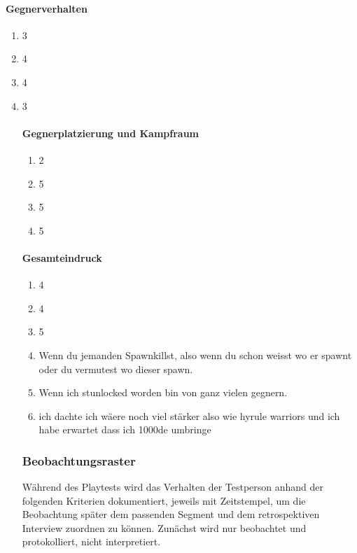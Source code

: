 \documentclass[../Main.tex]{subfiles}
\begin{document}
\paragraph{Gegnerverhalten}
\begin{enumerate}[label=\textbf{Q\arabic*}, leftmargin=1.5cm, itemsep=0.5em]
    \item 3
    \item 4
    \item 4
    \item 3
 
\paragraph{Gegnerplatzierung und Kampfraum}
\begin{enumerate}[label=\textbf{Q\arabic*}, leftmargin=1.5cm, itemsep=0.5em, resume]
    \item 2
    \item 5
    \item 5
    \item 5
\end{enumerate}
 
\paragraph{Gesamteindruck}
\begin{enumerate}[label=\textbf{Q\arabic*}, leftmargin=1.5cm, itemsep=0.5em, resume]
    \item 4
    \item 4
    \item 5
    \item Wenn du jemanden Spawnkillst, also wenn du schon weisst wo er spawnt oder du vermutest wo dieser spawn. 
    \item Wenn ich stunlocked worden bin von ganz vielen gegnern.
    \item ich dachte ich wäere noch viel stärker also wie hyrule warriors und ich habe erwartet dass ich 1000de umbringe
\end{enumerate}

\subsubsection{Beobachtungsraster}
 
Während des Playtests wird das Verhalten der Testperson anhand der folgenden Kriterien dokumentiert, jeweils mit Zeitstempel, um die Beobachtung später dem passenden Segment und dem retrospektiven Interview zuordnen zu können. Zunächst wird nur beobachtet und protokolliert, nicht interpretiert.
 

\end{enumerate}
\end{document}
